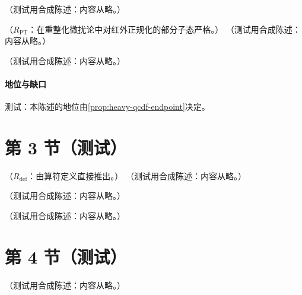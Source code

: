 \begin{example}[最低阶的软胶子极点机制]\label{ex:power-sgp}
（测试用合成陈述：内容从略。）
\end{example}

\begin{proposition}\label{prop:power-next-to-soft}
（$R_{\mathrm{PT}}$：在重整化微扰论中对红外正规化的部分子态严格。）
（测试用合成陈述：内容从略。）
\end{proposition}

\begin{proposition}\label{prop:power-nlp-endpoint}
（测试用合成陈述：内容从略。）
\end{proposition}
\paragraph{地位与缺口}测试：本陈述的地位由\cref{prop:heavy-qcdf-endpoint}决定。

\section{第 3 节（测试）}\label{sec:power-nlp}

\begin{proposition}\label{prop:power-rearrangement}
（$R_{\mathrm{def}}$：由算符定义直接推出。）
（测试用合成陈述：内容从略。）
\end{proposition}

\begin{remark}\label{rem:power-practical-ope}
（测试用合成陈述：内容从略。）
\end{remark}

\begin{definition}\label{def:power-borel}
（测试用合成陈述：内容从略。）
\end{definition}

\section{第 4 节（测试）}\label{sec:power-ope-basis}

\begin{proposition}\label{prop:power-adler-large-beta0}
（测试用合成陈述：内容从略。）
\end{proposition}
